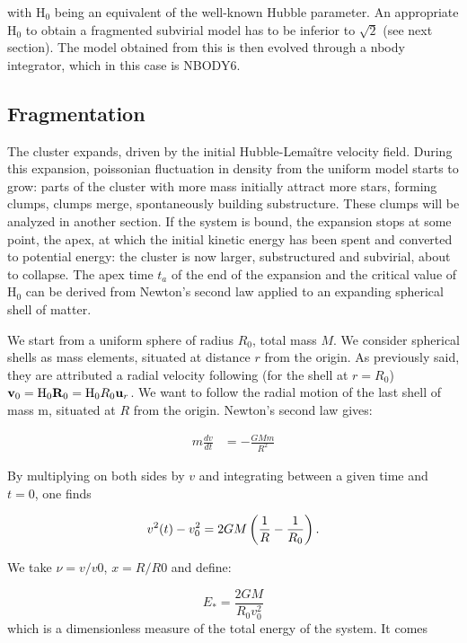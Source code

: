 with H$_0$ being an equivalent of the well-known Hubble parameter. An appropriate H$_0$ to obtain a fragmented subvirial model has to be inferior to $\sqrt{2}$ (see next section). The model obtained from this is then evolved through a nbody integrator, which in this case is NBODY6.


\subsection{Fragmentation}
\label{Sec:1_apextime}

The cluster expands, driven by the initial Hubble-Lema\^itre velocity field. During this expansion, poissonian fluctuation in density from the uniform model starts to grow: parts of the cluster with more mass initially attract more stars, forming clumps, clumps merge, spontaneously building substructure. These clumps will be analyzed in another section. If the system is bound, the expansion stops at some point, the apex, at which the initial kinetic energy has been spent and converted to potential energy: the cluster is now larger, substructured and subvirial, about to collapse. The apex time $t_a$ of the end of the expansion and the critical value of H$_0$ can be derived from Newton's second law applied to an expanding spherical shell of matter.

We start from a uniform sphere of radius $R_0$, total mass $M$. We consider spherical shells as mass elements, situated at distance $r$ from the origin. As previously said, they are attributed a radial velocity following (for the shell at $r=R_0$) $\bold v_0 = {\textrm{H}}_0 \bold R_0 = {\textrm{H}}_0 R_0 \bold u_r$. We want to follow the radial motion of the last shell of mass m, situated at $R$ from the origin. Newton's second law gives:


\begin{align}\label{eq:newton}
m \frac{dv}{dt} & = - \frac{G M m}{R^2}
\end{align}

By multiplying on both sides by $v$ and integrating between a given time and $t=0$, one finds

\begin{equation}
v^2(t) - v^2_0 = 2GM \left( \frac{1}{R} - \frac{1}{R_0} \right).
\end{equation}

We take $\nu = v/v0$,  $x= R/R0$ and define:

\begin{equation}
\label{Eq:1_Estar}
E_\ast = \frac{2GM}{R_0 v_0^2}
\end{equation}
which is a dimensionless measure of the total energy of the system. It comes

